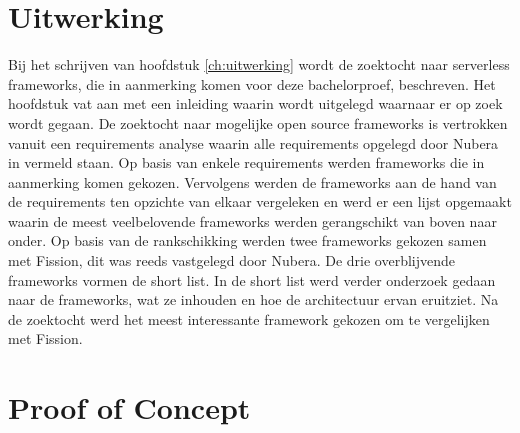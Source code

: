 \section{Uitwerking}
Bij het schrijven van hoofdstuk \ref{ch:uitwerking} wordt de zoektocht naar 
 serverless frameworks, die in aanmerking komen voor deze bachelorproef, beschreven. Het hoofdstuk vat aan met een inleiding waarin wordt uitgelegd waarnaar er op zoek wordt gegaan. De zoektocht naar mogelijke open source frameworks is vertrokken vanuit een requirements analyse waarin alle requirements opgelegd door Nubera in vermeld staan. Op basis van enkele requirements werden frameworks die in aanmerking komen gekozen. Vervolgens werden de frameworks aan de hand van de requirements ten opzichte van elkaar vergeleken en werd er een lijst opgemaakt waarin de meest veelbelovende frameworks werden gerangschikt van boven naar onder. Op basis van de rankschikking werden twee frameworks gekozen samen met Fission, dit was reeds vastgelegd door Nubera. De drie overblijvende frameworks vormen de short list. In de short list werd verder onderzoek gedaan naar de frameworks, wat ze inhouden en hoe de architectuur ervan eruitziet. Na de zoektocht werd het meest interessante framework gekozen om te vergelijken met Fission.

\section{Proof of Concept}

